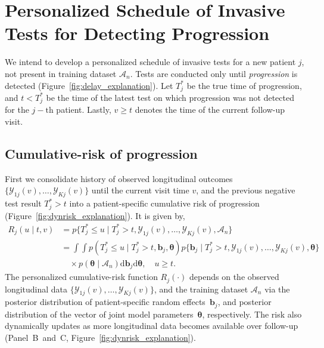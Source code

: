 \section{Personalized Schedule of Invasive Tests for Detecting Progression}
\label{sec:schedule}
We intend to develop a personalized schedule of invasive tests for a new patient $j$, not present in training dataset $\mathcal{A}_n$. Tests are conducted only until \textit{progression} is detected (Figure~\ref{fig:delay_explanation}). Let $T^*_j$ be the true time of progression, and ${t < T^*_j}$ be the time of the latest test on which progression was not detected for the ${j-\mbox{th}}$ patient. Lastly, ${v \geq t}$ denotes the time of the current follow-up visit.

\subsection{Cumulative-risk of progression}
\label{subsec:cum_risk}
First we consolidate history of observed longitudinal outcomes $\{\mathcal{Y}_{1j}(v), \ldots, \mathcal{Y}_{Kj}(v)\}$ until the current visit time $v$, and the previous negative test result ${T^*_j > t}$ into a patient-specific cumulative risk of progression (Figure~\ref{fig:dynrisk_explanation}). It is given by,
\begin{equation}
\label{eq:cumulative_risk}
\begin{split}
R_j(u \mid t, v) &= p\big\{T^*_j \leq u \mid T^*_j > t, \mathcal{Y}_{1j}(v), \ldots, \mathcal{Y}_{Kj}(v), \mathcal{A}_n\big\}\\
&=\int \int p(T^*_j \leq u \mid T^*_j > t, \boldsymbol{b}_{j}, \boldsymbol{\theta}) p\big\{\boldsymbol{b}_j \mid T^*_j > t, \mathcal{Y}_{1j}(v), \ldots, \mathcal{Y}_{Kj}(v), \boldsymbol{\theta} \big\}\\
&\quad \times p(\boldsymbol{\theta} \mid \mathcal{A}_n) \mathrm{d}\boldsymbol{b}_j \mathrm{d}\boldsymbol{\theta}, \quad u \geq t.
\end{split}
\end{equation}
The personalized cumulative-risk function $R_j(\cdot)$ depends on the observed longitudinal data $\{\mathcal{Y}_{1j}(v), \ldots, \mathcal{Y}_{Kj}(v)\}$, and the training dataset $\mathcal{A}_n$ via the posterior distribution of patient-specific random effects~$\boldsymbol{b}_j$, and posterior distribution of the vector of joint model parameters~$\boldsymbol{\theta}$, respectively. The risk also dynamically updates as more longitudinal data becomes available over follow-up (Panel~B~and~C, Figure~\ref{fig:dynrisk_explanation}).

